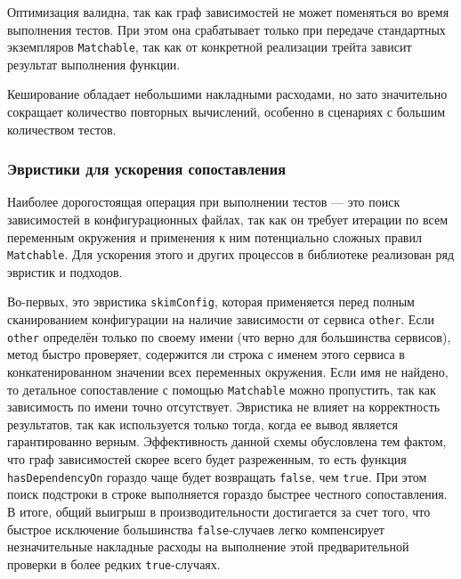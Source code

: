 



Оптимизация валидна, так как граф зависимостей не может поменяться во время выполнения тестов. При этом она срабатывает только при передаче стандартных экземпляров \verb|Matchable|, так как от конкретной реализации трейта зависит результат выполнения функции.

Кеширование обладает небольшими накладными расходами, но зато значительно сокращает количество повторных вычислений, особенно в сценариях с большим количеством тестов.

\subsubsection{Эвристики для ускорения сопоставления}

Наиболее дорогостоящая операция при выполнении тестов — это поиск зависимостей в конфигурационных файлах, так как он требует итерации по всем переменным окружения и применения к ним потенциально сложных правил \verb|Matchable|. Для ускорения этого и других процессов в библиотеке реализован ряд эвристик и подходов.

Во-первых, это эвристика \verb|skimConfig|, которая применяется перед полным сканированием конфигурации на наличие зависимости от сервиса \verb|other|. Если \verb|other| определён только по своему имени (что верно для большинства сервисов), метод быстро проверяет, содержится ли строка с именем этого сервиса в конкатенированном значении всех переменных окружения. Если имя не найдено, то детальное сопоставление с помощью \verb|Matchable| можно пропустить, так как зависимость по имени точно отсутствует. Эвристика не влияет на корректность результатов, так как используется только тогда, когда ее вывод является гарантированно верным. Эффективность данной схемы обусловлена тем фактом, что граф зависимостей скорее всего будет разреженным, то есть функция \verb|hasDependencyOn| гораздо чаще будет возвращать \verb|false|, чем \verb|true|. При этом поиск подстроки в строке выполняется гораздо быстрее честного сопоставления. В итоге, общий выигрыш в производительности достигается за счет того, что быстрое исключение большинства \verb|false|-случаев легко компенсирует незначительные накладные расходы на выполнение этой предварительной проверки в более редких \verb|true|-случаях.

